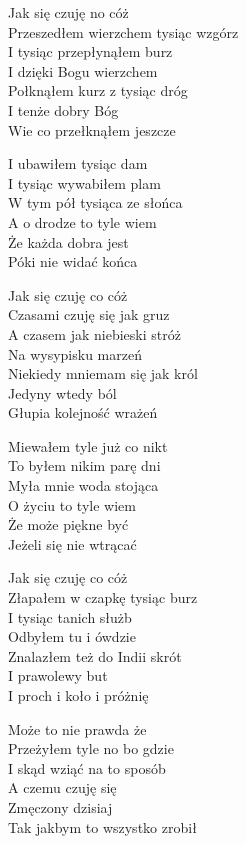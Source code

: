 
\begin{text}
    Jak się czuję no cóż\\
    Przeszedłem wierzchem tysiąc wzgórz\\
    I tysiąc przepłynąłem burz\\
    I dzięki Bogu wierzchem\\
    Połknąłem kurz z tysiąc dróg\\
    I tenże dobry Bóg\\
    Wie co przełknąłem jeszcze

    I ubawiłem tysiąc dam\\
    I tysiąc wywabiłem plam\\
    W tym pół tysiąca ze słońca\\
    A o drodze to tyle wiem\\
    Że każda dobra jest\\
    Póki nie widać końca

    Jak się czuję co cóż\\
    Czasami czuję się jak gruz\\
    A czasem jak niebieski stróż\\
    Na wysypisku marzeń\\
    Niekiedy mniemam się jak król\\
    Jedyny wtedy ból\\
    Głupia kolejność wrażeń

    Miewałem tyle już co nikt\\
    To byłem nikim parę dni\\
    Myła mnie woda stojąca\\
    O życiu to tyle wiem\\
    Że może piękne być\\
    Jeżeli się nie wtrącać

    Jak się czuję co cóż\\
    Złapałem w czapkę tysiąc burz\\
    I tysiąc tanich służb\\
    Odbyłem tu i ówdzie\\
    Znalazłem też do Indii skrót\\
    I prawolewy but\\
    I proch i koło i próżnię

    Może to nie prawda że\\
    Przeżyłem tyle no bo gdzie\\
    I skąd wziąć na to sposób\\
    A czemu czuję się\\
    Zmęczony dzisiaj\\
    Tak jakbym to wszystko zrobił
\end{text}
